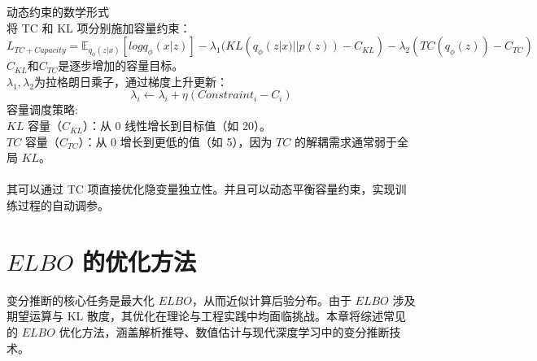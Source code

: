 \documentclass[final]{ws-ijseke}
\begin{document}
动态约束的数学形式\\
将 TC 和 KL 项分别施加容量约束：\\
\begin{equation*}
    L_{TC+Capacity} = \mathbb{E}_{q_\phi(z|x)}[logq_\phi(x|z)] - \lambda_1(KL(q_\phi(z|x)||p(z))-C_{KL}) - \lambda_2(TC(q_\phi(z))-C_{TC})
\end{equation*}
$C_{KL}$和$C_{TC}$是逐步增加的容量目标。\\$\lambda_1,\lambda_2$为拉格朗日乘子，通过梯度上升更新：
\begin{equation*}
    \lambda_i←\lambda_i+\eta(Constraint_i-C_i)
\end{equation*}
容量调度策略:\\
$KL$ 容量（$C_{KL}$）：从 0 线性增长到目标值（如 20）。\\
$TC$ 容量（$C_{TC}$）：从 0 增长到更低的值（如 5），因为 $TC$ 的解耦需求通常弱于全局 $KL$。\\\\
\hspace*{2em} 其可以通过 TC 项直接优化隐变量独立性。并且可以动态平衡容量约束，实现训练过程的自动调参。
\section{$ELBO$ 的优化方法}
\hspace*{2em} 变分推断的核心任务是最大化 $ELBO$，从而近似计算后验分布。由于 $ELBO$ 涉及期望运算与 KL 散度，其优化在理论与工程实践中均面临挑战。本章将综述常见的 $ELBO$ 优化方法，涵盖解析推导、数值估计与现代深度学习中的变分推断技术。
\end{document}
